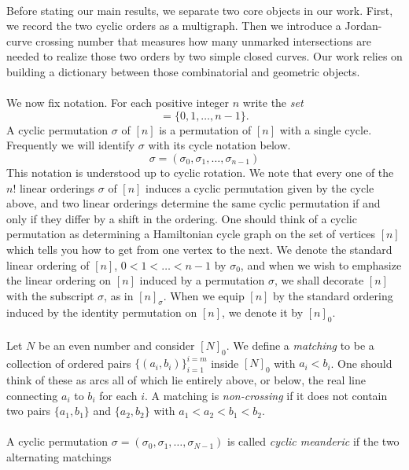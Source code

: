 \documentclass[11pt,a4paper]{amsart}
\theoremstyle{definition}
\theoremstyle{remark}
\begin{document}
\\
Before stating our main results, we separate two core objects in our work.  First, we record the two cyclic orders as a multigraph.  Then we introduce a Jordan-curve crossing number that measures how many unmarked intersections are needed to realize those two orders by two simple closed curves.  Our work relies on building a dictionary between those combinatorial and geometric objects.
\\
\\
We now fix notation. For each positive integer $n$ write the \emph{set}
\begin{equation*}
        [n]=\{0,1,\ldots,n-1\}.
\end{equation*}
A cyclic permutation $\sigma$ of $[n]$ is a permutation of $[n]$ with a single cycle.  Frequently we will identify $\sigma$ with its cycle notation below.    
\begin{equation*}
        \sigma=(\sigma_0,\sigma_1,\ldots,\sigma_{n-1})
\end{equation*}
This notation is understood up to cyclic rotation.  We note that every one of the $n!$ linear orderings $\sigma$ of $[n]$ induces a cyclic permutation given by the cycle above, and two linear orderings determine the same cyclic permutation if and only if they differ by a shift in the ordering.  One should think of a cyclic permutation as determining a Hamiltonian cycle graph on the set of vertices $[n]$ which tells you how to get from one vertex to the next.  We denote the standard linear ordering of $[n]$, $0 < 1 < \hdots < n-1$ by $\sigma_{0}$, and when we wish to emphasize the linear ordering on $[n]$ induced by a permutation $\sigma$, we shall decorate $[n]$ with the subscript $\sigma$, as in $[n]_{\sigma}$.  When we equip $[n]$ by the standard ordering induced by the identity permutation on $[n]$, we denote it by $[n]_{0}$.  
\\
\\
Let $N$ be an even number and consider $[N]_{0}$.  We define a \emph{matching} to be a collection of ordered pairs $\{(a_{i},b_{i})\}_{i=1}^{i=m}$ inside $[N]_{0}$ with $a_{i} < b_{i}$.  One should think of these as arcs all of which lie entirely above, or below, the real line connecting $a_{i}$ to $b_{i}$ for each $i$.  A matching is \emph{non-crossing} if it does not contain two pairs $\{a_{1},b_{1}\}$ and $\{a_{2},b_{2}\}$ with $a_{1}<a_{2}<b_{1}<b_{2}$.  \\
\\
A cyclic permutation $\sigma = (\sigma_{0},\sigma_{1},\hdots, \sigma_{N-1})$ is called \emph{cyclic meanderic} if the two alternating matchings
\end{document}
